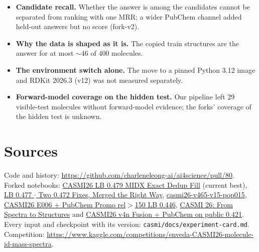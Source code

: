 \documentclass[11pt]{article}
\begin{document}
\begin{itemize}
    input --- were selected on the public split, as was v19's similarity threshold, so 0.356 is optimistic.
    The forks' settings were fixed by their authors before we saw any result, but tuned on the public
    leaderboard (the E006 notebook reports its threshold sweep there; the 0.456 notebook chose its
    popularity weight there), so 0.446, 0.456, 0.465, 0.477 and 0.479 may be optimistic too.
  \item \textbf{Candidate recall.} Whether the answer is among the candidates cannot be separated
    from ranking with one MRR; a wider PubChem channel added held-out answers but no score (fork-v2).
  \item \textbf{Why the data is shaped as it is.} The copied train structures are the answer for at
    most $\sim$46 of 400 molecules.
  \item \textbf{The environment switch alone.} The move to a pinned Python 3.12 image and RDKit
    2026.3 (v12) was not measured separately.
  \item \textbf{Forward-model coverage on the hidden test.} Our pipeline left 29 visible-test molecules
    without forward-model evidence; the forks' coverage of the hidden test is unknown.
\end{itemize}

\section*{Sources}
\sloppy
Code and history: \url{https://github.com/charleneleong-ai/ai4science/pull/80}. Forked notebooks: \href{https://www.kaggle.com/code/alexchilton/casmi26-lb-0-479-midx-exact-dedup-fill}{CASMI26 LB 0.479 \textbar{} MIDX Exact Dedup Fill} (current best), \href{https://www.kaggle.com/code/busyaprime/lb-0-477-two-0-472-fixes-merged-the-right-way}{LB 0.477 $\cdot$ Two 0.472 Fixes, Merged the Right Way}, \href{https://www.kaggle.com/code/guhongbin/casmi26-v465-v15-pop015}{casmi26-v465-v15-pop015}, \href{https://www.kaggle.com/code/seyitkaangunes/casmi26-e006-pubchem-promo-rel-150-lb-0-446}{CASMI26 \textbar{} E006 + PubChem Promo rel$>$150 \textbar{} LB 0.446}, \href{https://www.kaggle.com/code/dmitriigluzdov/casmi-26-from-spectra-to-structures}{CASMI 26: From Spectra to Structures} and \href{https://www.kaggle.com/code/huseyinemreaksoy/casmi26-v4n-fusion-pubchem-on-public-0-421}{CASMI26 \textbar{} v4n Fusion + PubChem on public 0.421}.
Every input and
checkpoint with its version: \texttt{casmi/docs/experiment-card.md}. Competition:
\url{https://www.kaggle.com/competitions/enveda-CASMI26-molecule-id-mass-spectra}.
\end{document}

